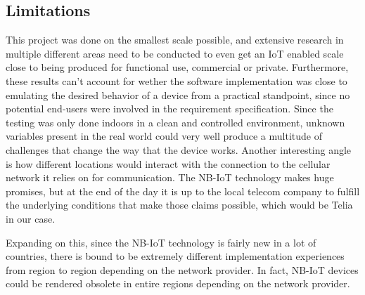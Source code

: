\subsection{Limitations}
This project was done on the smallest scale possible, and extensive research in multiple different areas need to be conducted to even get an IoT enabled scale close to being produced for functional use, commercial or private.
Furthermore, these results can't account for wether the software implementation was close to emulating the desired behavior of a device from a practical standpoint, since no potential end-users were involved in the requirement specification.
Since the testing was only done indoors in a clean and controlled environment, unknown variables present in the real world could very well produce a multitude of challenges that change the way that the device works. Another interesting angle is how different locations would interact with the connection to the cellular network it relies on for communication. The NB-IoT technology makes huge promises, but at the end of the day it is up to the local telecom company to fulfill the underlying conditions that make those claims possible, which would be Telia in our case.

Expanding on this, since the NB-IoT technology is fairly new in a lot of countries, there is bound to be extremely different implementation experiences from region to region depending on the network provider. In fact, NB-IoT devices could be rendered obsolete in entire regions depending on the network provider.
